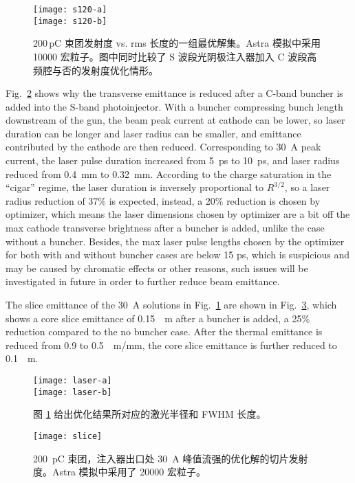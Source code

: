 \begin{figure}[htbp]
	\centering
	\texttt{[image: s120-a]}\\
	\texttt{[image: s120-b]}
	\caption{
	200\,pC 束团发射度 vs. rms 长度的一组最优解集。Astra 模拟中采用 10000 宏粒子。图中同时比较了 S 波段光阴极注入器加入 C 波段高频腔与否的发射度优化情形。}
	\label{Pareto120}
\end{figure}

Fig.~\ref{laser_dimension} shows why the transverse emittance is reduced after a C-band buncher is added into the S-band photoinjector. With a buncher compressing bunch length downstream of the gun, the beam peak current at cathode can be lower, so laser duration can be longer and laser radius can be smaller, and emittance contributed by the cathode are then reduced. Corresponding to \SI{30}{A} peak current, the laser pulse duration increased from \SI{5}{ps} to \SI{10}{ps}, and laser radius reduced from \SI{0.4}{mm} to \SI{0.32}{mm}. According to the charge saturation in the ``cigar'' regime, the laser duration is inversely proportional to $R^{3/2}$, so a laser radius reduction of 37\% is expected, instead, a 20\% reduction is chosen by optimizer, which means the laser dimensions chosen by optimizer are a bit off the max cathode transverse brightness after a buncher is added, unlike the case without a buncher. Besides, the max laser pulse lengths chosen by the optimizer for both with and without buncher cases are below  15 ps, which is suspicious and may be caused by chromatic effects or other reasons, such issues will be investigated in future in order to further reduce beam emittance.

The slice emittance of the \SI{30}{A} solutions in Fig.~\ref{Pareto120} are shown in Fig.~\ref{slice_emittance}, which shows a core slice emittance of \SI{0.15}{\mu m} after a buncher is added, a 25\% reduction compared to the no buncher case. After the thermal emittance is reduced from 0.9 to \SI{0.5}{\mu m/mm}, the core slice emittance is further reduced to \SI{0.1}{\mu m}.

\begin{figure}[htbp]
	\centering
	\texttt{[image: laser-a]}\\
	\texttt{[image: laser-b]}
	\caption{图 \ref{Pareto120} 给出优化结果所对应的激光半径和 FWHM 长度。}
	\label{laser_dimension}
\end{figure}

\begin{figure}[htbp]
	\centering
	\texttt{[image: slice]}
	\caption{\SI{200}{pC} 束团，注入器出口处 \SI{30}{A} 峰值流强的优化解的切片发射度。Astra 模拟中采用了 20000 宏粒子。}
	\label{slice_emittance}
\end{figure}

